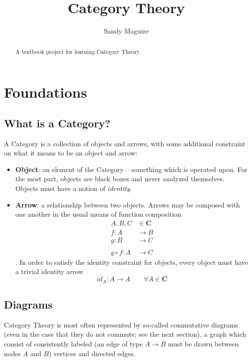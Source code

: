 \documentclass[]{article}
\title{Category Theory}
\author{Sandy Maguire}
\newcommand{\cat}[1]{\mathbf{#1}}
\begin{document}
\maketitle

\begin{abstract}
A textbook project for learning Category Theory.
\end{abstract}

\newpage

\section{Foundations}

\subsection{What is a Category?}

A Category is a collection of objects and arrows, with some additional constraint on what it means to be an object and arrow:

\begin{itemize}
\item \textbf{Object}: an element of the Category -- something which is operated upon. For the most part, objects are black boxes and never analyzed themselves. Objects must have a notion of \textit{identity}.
\item \textbf{Arrow}: a relationship between two objects. Arrows may be composed with one another in the usual means of function composition 
\begin{align*}
A, B, C &\in \cat{C} \\
f: A &\to B \\
g: B &\to C \\
\\
g \circ f: A &\to C
\end{align*}
. In order to satisfy the identity constraint for objects, every object must have a trivial identity arrow $$id_A: A \to A \qquad \forall A \in \cat{C}$$
\end{itemize}

\subsection{Diagrams}

Category Theory is most often represented by so-called commutative diagrams (even in the case that they do not commute; see the next section), a graph which consist of consistently labeled (an edge of type $A \to B$ must be drawn between nodes $A$ and $B$) vertices and directed edges.
\end{document}
